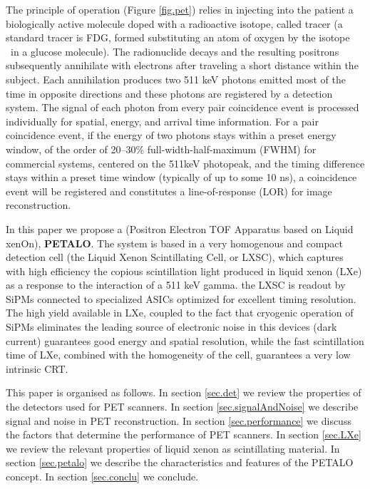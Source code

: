 \documentclass[review]{elsarticle}
\begin{document}
The principle of operation (Figure \ref{fig.pet}) relies in injecting into the patient a  
biologically active molecule doped with a radioactive isotope, called tracer (a standard tracer is FDG, formed substituting an atom of oxygen by the isotope \FDG\ in a glucose molecule). The radionuclide decays and the resulting positrons
subsequently annihilate with electrons after traveling a short distance within the subject.
Each annihilation produces two 511 keV photons emitted most of the time in opposite
directions and these photons are registered by a detection system. The signal of each photon
from every pair coincidence event is processed individually for spatial, energy, and arrival
time information. For a pair coincidence event, if the energy of two photons stays within a
preset energy window, of the order of 20--30\% full-width-half-maximum (FWHM) for commercial systems, centered on the 511keV photopeak, and the timing difference stays within a preset time window (typically of up to some 10 ns), a
coincidence event will be registered and constitutes a line-of-response (LOR) for image
reconstruction.

In this paper we propose a (Positron Electron TOF Apparatus based on Liquid xenOn), {\bf PETALO}. The system is based in a very homogenous and compact detection cell (the Liquid Xenon Scintillating Cell, or LXSC), which captures with high efficiency the copious scintillation light produced in liquid xenon (LXe) as a response to the interaction of a 511 keV gamma.  the LXSC is readout by SiPMs connected to specialized ASICs optimized for excellent timing resolution. The high yield available in LXe, coupled to the fact that cryogenic operation of SiPMs eliminates the leading source of electronic noise in this devices (dark current) guarantees good energy and spatial resolution, while the fast scintillation time of LXe, combined with the homogeneity of the cell, guarantees a very low intrinsic CRT.

This paper is organised as follows. In section \ref{sec.det} we review the properties of the detectors used for PET scanners. In section \ref{sec.signalAndNoise} we describe signal and noise in PET reconstruction. In section \ref{sec.performance} we discuss the factors that determine the performance of PET scanners. In section \ref{sec.LXe} we review the relevant properties of liquid xenon as scintillating material. In section \ref{sec.petalo} we describe the characteristics and features of the PETALO concept. In section \ref{sec.conclu} we conclude. 
\end{document}
